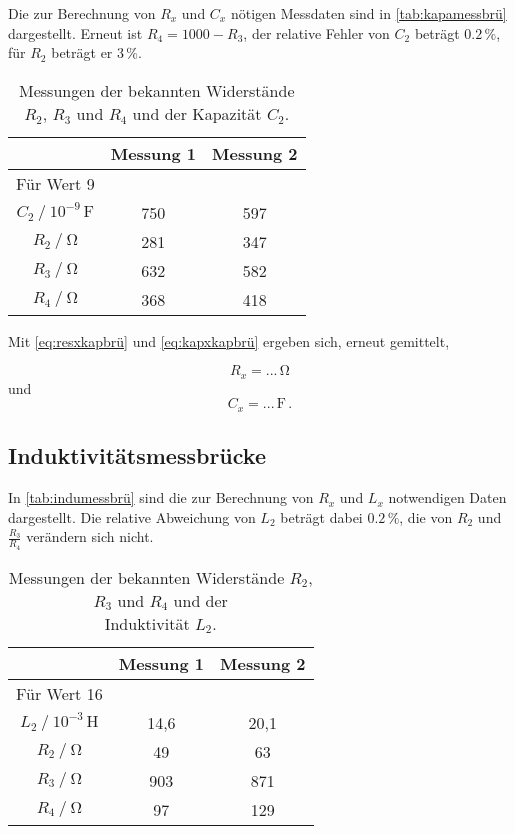 Die zur Berechnung von $R_x$ und $C_x$ nötigen Messdaten sind in \autoref{tab:kapamessbrü}
dargestellt. Erneut ist $R_4 = 1000 - R_3$, der relative Fehler von $C_2$ beträgt $0.2 \,\%$, für $R_2$
beträgt er $3 \,\%$.

\begin{table}[H]
  \centering
  \caption{Messungen der bekannten Widerstände $R_2$, $R_3$ und $R_4$ und der Kapazität $C_2$.}
  \label{tab:kapamessbrü}
  \begin{tabular}{S S S}
    \toprule
    & {Messung 1} & {Messung 2} \\
    \midrule
    {Für Wert 9} \\
    {$C_2 \mathbin{/} 10^{-9} \,\unit{\farad}$} &  750 & 597\\
                {$R_2 \mathbin{/} \unit{\ohm}$} &  281 & 347 \\
                {$R_3 \mathbin{/} \unit{\ohm}$} &  632 & 582 \\
                {$R_4 \mathbin{/} \unit{\ohm}$} &  368 & 418 \\
  \end{tabular}
\end{table}

Mit \eqref{eq:resxkapbrü} und \eqref{eq:kapxkapbrü} ergeben sich, erneut gemittelt,

\begin{equation*}
  R_x = ... \,\unit{\ohm}
\end{equation*}
und
\begin{equation*}
  C_x = ... \,\unit{\farad} \,.
\end{equation*}


\subsection{Induktivitätsmessbrücke}

In \autoref{tab:indumessbrü} sind die zur Berechnung von $R_x$ und $L_x$ notwendigen Daten dargestellt.
Die relative Abweichung von $L_2$ beträgt dabei $0.2 \,\%$, die von $R_2$ und $\frac{R_3}{R_4}$ verändern
sich nicht.

\begin{table}[H]
  \centering
  \caption{Messungen der bekannten Widerstände $R_2$, $R_3$ und $R_4$ und der \\ Induktivität $L_2$.}
  \label{tab:indumessbrü}
  \begin{tabular}{S S[table-format=3.1] S[table-format=3.1]}
    \toprule
    & {Messung 1} & {Messung 2} \\
    \midrule
    {Für Wert 16} \\
    {$L_2 \mathbin{/} 10^{-3} \,\unit{\henry}$} &   14,6  &    20,1   \\
                {$R_2 \mathbin{/} \unit{\ohm}$} &   49    &    63     \\
                {$R_3 \mathbin{/} \unit{\ohm}$} &  903    &   871     \\
                {$R_4 \mathbin{/} \unit{\ohm}$} &   97    &   129     \\
  \end{tabular}
\end{table}

